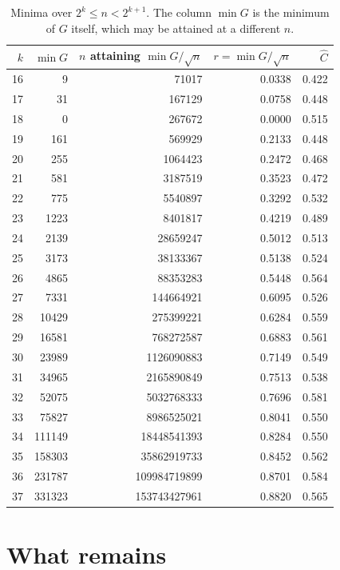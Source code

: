 \documentclass[11pt,letterpaper]{article}
\theoremstyle{remark}
\begin{document}
\begin{table}[ht]
\centering\small
\begin{tabular}{rrrrr}
\toprule
$k$ & $\min G$ & $n$ attaining $\min G/\sqrt n$ & $r=\min G/\sqrt n$ & $\hat C$ \\
\midrule
16 & 9 & 71017 & 0.0338 & 0.422 \\
17 & 31 & 167129 & 0.0758 & 0.448 \\
18 & 0 & 267672 & 0.0000 & 0.515 \\
19 & 161 & 569929 & 0.2133 & 0.448 \\
20 & 255 & 1064423 & 0.2472 & 0.468 \\
21 & 581 & 3187519 & 0.3523 & 0.472 \\
22 & 775 & 5540897 & 0.3292 & 0.532 \\
23 & 1223 & 8401817 & 0.4219 & 0.489 \\
24 & 2139 & 28659247 & 0.5012 & 0.513 \\
25 & 3173 & 38133367 & 0.5138 & 0.524 \\
26 & 4865 & 88353283 & 0.5448 & 0.564 \\
27 & 7331 & 144664921 & 0.6095 & 0.526 \\
28 & 10429 & 275399221 & 0.6284 & 0.559 \\
29 & 16581 & 768272587 & 0.6883 & 0.561 \\
30 & 23989 & 1126090883 & 0.7149 & 0.549 \\
31 & 34965 & 2165890849 & 0.7513 & 0.538 \\
32 & 52075 & 5032768333 & 0.7696 & 0.581 \\
33 & 75827 & 8986525021 & 0.8041 & 0.550 \\
34 & 111149 & 18448541393 & 0.8284 & 0.550 \\
35 & 158303 & 35862919733 & 0.8452 & 0.562 \\
36 & 231787 & 109984719899 & 0.8701 & 0.584 \\
37 & 331323 & 153743427961 & 0.8820 & 0.565 \\
\bottomrule
\end{tabular}
\caption{Minima over $2^k\le n<2^{k+1}$. The column $\min G$ is the minimum of $G$ itself, which may be attained at a different $n$.}
\label{tab:ratio}
\end{table}

\section{What remains}
\end{document}
